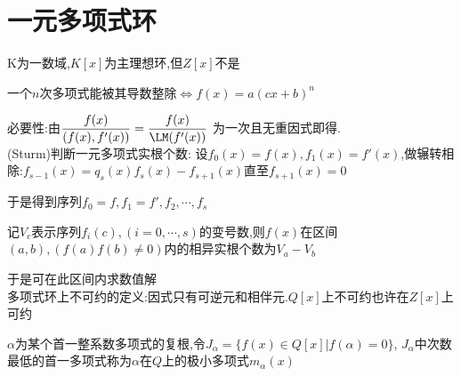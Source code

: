 \section{一元多项式环}
K为一数域,$ K[x]$为主理想环,但$ Z[x]$不是

一个$ n$次多项式能被其导数整除$ \Leftrightarrow f(x)=a(cx+b)^n$

必要性:由$ \dfrac{f(x)}{(f(x),f'(x))}=\dfrac{f(x)}{\LM(f'(x))}$
为一次且无重因式即得.
\\

(Sturm)判断一元多项式实根个数:
设$ f_0(x)=f(x), f_1(x)=f'(x)$,做辗转相除:$ f_{s-1}(x)=q_s(x)f_s(x)-f_{s+1}(x)$直至$ f_{s+1}(x)=0$

于是得到序列$ f_0=f,f_1=f',f_2,\cdots,f_s$

记$ V_c$表示序列$ f_i(c),(i=0,\cdots,s)$的变号数,则$ f(x)$在区间$ (a,b),(f(a)f(b)\ne 0)$内的相异实根个数为$ V_a-V_b $

于是可在此区间内求数值解
\\

多项式环上不可约的定义:因式只有可逆元和相伴元.$Q[x] $上不可约也许在$ Z[x]$上可约

$ \alpha $为某个首一整系数多项式的复根,令$ J_{\alpha}=\{ f(x)\in Q[x] | f(\alpha)=0\}$,
$ J_{\alpha}$中次数最低的首一多项式称为$ \alpha $在$ Q$上的极小多项式$ m_{\alpha}(x)$
